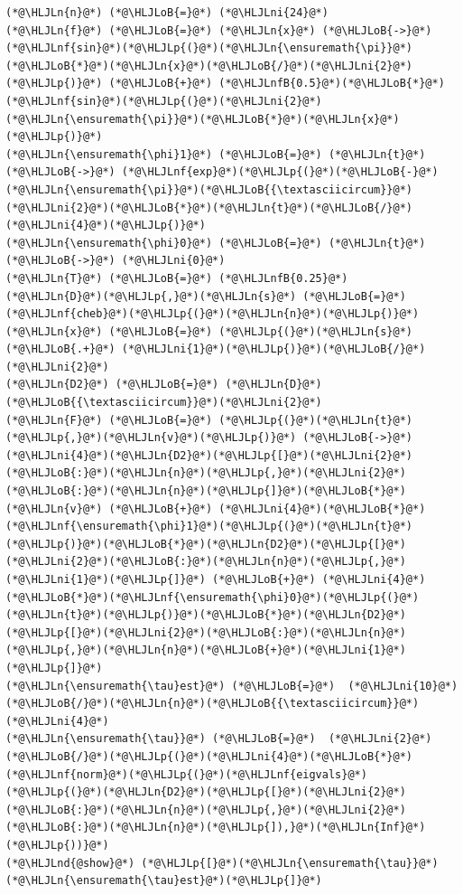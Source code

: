 \documentclass[12pt,a4paper]{article}
\newcommand{\HLJLn}[1]{#1}
\newcommand{\HLJLnd}[1]{\textcolor[RGB]{214,102,97}{#1}}
\newcommand{\HLJLnf}[1]{\textcolor[RGB]{66,102,213}{#1}}
\newcommand{\HLJLnfB}[1]{\textcolor[RGB]{59,151,46}{#1}}
\newcommand{\HLJLni}[1]{\textcolor[RGB]{59,151,46}{#1}}
\newcommand{\HLJLoB}[1]{\textcolor[RGB]{102,102,102}{\textbf{#1}}}
\newcommand{\HLJLp}[1]{#1}
\begin{document}
\begin{lstlisting}
(*@\HLJLn{n}@*) (*@\HLJLoB{=}@*) (*@\HLJLni{24}@*)
(*@\HLJLn{f}@*) (*@\HLJLoB{=}@*) (*@\HLJLn{x}@*) (*@\HLJLoB{->}@*) (*@\HLJLnf{sin}@*)(*@\HLJLp{(}@*)(*@\HLJLn{\ensuremath{\pi}}@*)(*@\HLJLoB{*}@*)(*@\HLJLn{x}@*)(*@\HLJLoB{/}@*)(*@\HLJLni{2}@*)(*@\HLJLp{)}@*) (*@\HLJLoB{+}@*) (*@\HLJLnfB{0.5}@*)(*@\HLJLoB{*}@*)(*@\HLJLnf{sin}@*)(*@\HLJLp{(}@*)(*@\HLJLni{2}@*)(*@\HLJLn{\ensuremath{\pi}}@*)(*@\HLJLoB{*}@*)(*@\HLJLn{x}@*)(*@\HLJLp{)}@*)
(*@\HLJLn{\ensuremath{\phi}1}@*) (*@\HLJLoB{=}@*) (*@\HLJLn{t}@*) (*@\HLJLoB{->}@*) (*@\HLJLnf{exp}@*)(*@\HLJLp{(}@*)(*@\HLJLoB{-}@*)(*@\HLJLn{\ensuremath{\pi}}@*)(*@\HLJLoB{{\textasciicircum}}@*)(*@\HLJLni{2}@*)(*@\HLJLoB{*}@*)(*@\HLJLn{t}@*)(*@\HLJLoB{/}@*)(*@\HLJLni{4}@*)(*@\HLJLp{)}@*)
(*@\HLJLn{\ensuremath{\phi}0}@*) (*@\HLJLoB{=}@*) (*@\HLJLn{t}@*) (*@\HLJLoB{->}@*) (*@\HLJLni{0}@*)
(*@\HLJLn{T}@*) (*@\HLJLoB{=}@*) (*@\HLJLnfB{0.25}@*)
(*@\HLJLn{D}@*)(*@\HLJLp{,}@*)(*@\HLJLn{s}@*) (*@\HLJLoB{=}@*) (*@\HLJLnf{cheb}@*)(*@\HLJLp{(}@*)(*@\HLJLn{n}@*)(*@\HLJLp{)}@*)
(*@\HLJLn{x}@*) (*@\HLJLoB{=}@*) (*@\HLJLp{(}@*)(*@\HLJLn{s}@*) (*@\HLJLoB{.+}@*) (*@\HLJLni{1}@*)(*@\HLJLp{)}@*)(*@\HLJLoB{/}@*)(*@\HLJLni{2}@*)
(*@\HLJLn{D2}@*) (*@\HLJLoB{=}@*) (*@\HLJLn{D}@*)(*@\HLJLoB{{\textasciicircum}}@*)(*@\HLJLni{2}@*)
(*@\HLJLn{F}@*) (*@\HLJLoB{=}@*) (*@\HLJLp{(}@*)(*@\HLJLn{t}@*)(*@\HLJLp{,}@*)(*@\HLJLn{v}@*)(*@\HLJLp{)}@*) (*@\HLJLoB{->}@*) (*@\HLJLni{4}@*)(*@\HLJLn{D2}@*)(*@\HLJLp{[}@*)(*@\HLJLni{2}@*)(*@\HLJLoB{:}@*)(*@\HLJLn{n}@*)(*@\HLJLp{,}@*)(*@\HLJLni{2}@*)(*@\HLJLoB{:}@*)(*@\HLJLn{n}@*)(*@\HLJLp{]}@*)(*@\HLJLoB{*}@*)(*@\HLJLn{v}@*) (*@\HLJLoB{+}@*) (*@\HLJLni{4}@*)(*@\HLJLoB{*}@*)(*@\HLJLnf{\ensuremath{\phi}1}@*)(*@\HLJLp{(}@*)(*@\HLJLn{t}@*)(*@\HLJLp{)}@*)(*@\HLJLoB{*}@*)(*@\HLJLn{D2}@*)(*@\HLJLp{[}@*)(*@\HLJLni{2}@*)(*@\HLJLoB{:}@*)(*@\HLJLn{n}@*)(*@\HLJLp{,}@*)(*@\HLJLni{1}@*)(*@\HLJLp{]}@*) (*@\HLJLoB{+}@*) (*@\HLJLni{4}@*)(*@\HLJLoB{*}@*)(*@\HLJLnf{\ensuremath{\phi}0}@*)(*@\HLJLp{(}@*)(*@\HLJLn{t}@*)(*@\HLJLp{)}@*)(*@\HLJLoB{*}@*)(*@\HLJLn{D2}@*)(*@\HLJLp{[}@*)(*@\HLJLni{2}@*)(*@\HLJLoB{:}@*)(*@\HLJLn{n}@*)(*@\HLJLp{,}@*)(*@\HLJLn{n}@*)(*@\HLJLoB{+}@*)(*@\HLJLni{1}@*)(*@\HLJLp{]}@*)
(*@\HLJLn{\ensuremath{\tau}est}@*) (*@\HLJLoB{=}@*)  (*@\HLJLni{10}@*)(*@\HLJLoB{/}@*)(*@\HLJLn{n}@*)(*@\HLJLoB{{\textasciicircum}}@*)(*@\HLJLni{4}@*)
(*@\HLJLn{\ensuremath{\tau}}@*) (*@\HLJLoB{=}@*)  (*@\HLJLni{2}@*)(*@\HLJLoB{/}@*)(*@\HLJLp{(}@*)(*@\HLJLni{4}@*)(*@\HLJLoB{*}@*)(*@\HLJLnf{norm}@*)(*@\HLJLp{(}@*)(*@\HLJLnf{eigvals}@*)(*@\HLJLp{(}@*)(*@\HLJLn{D2}@*)(*@\HLJLp{[}@*)(*@\HLJLni{2}@*)(*@\HLJLoB{:}@*)(*@\HLJLn{n}@*)(*@\HLJLp{,}@*)(*@\HLJLni{2}@*)(*@\HLJLoB{:}@*)(*@\HLJLn{n}@*)(*@\HLJLp{]),}@*)(*@\HLJLn{Inf}@*)(*@\HLJLp{))}@*)
(*@\HLJLnd{@show}@*) (*@\HLJLp{[}@*)(*@\HLJLn{\ensuremath{\tau}}@*) (*@\HLJLn{\ensuremath{\tau}est}@*)(*@\HLJLp{]}@*)


\end{lstlisting}
\end{document}
